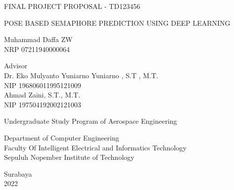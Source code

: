 \begin{large}
  FINAL PROJECT PROPOSAL - TD123456
\end{large}

\vspace{\fill}

\begin{spacing}{1.5}
  \begin{Large}
    POSE BASED SEMAPHORE PREDICTION USING DEEP LEARNING
  \end{Large}
\end{spacing}

\vspace{\fill}

\begin{large}
  Muhammad Daffa ZW \\
  \textnormal{NRP 07211940000064}
\end{large}

\vspace{\fill}

\begin{large}
  \textnormal{Advisor} \\
  Dr. Eko Mulyanto Yuniarno Yuniarno , S.T , M.T. \\
  \textnormal{NIP 196806011995121009} \\
  Ahmad Zaini, S.T., M.T. \\
  \textnormal{NIP 197504192002121003}
\end{large}

\vspace{\fill}

Undergraduate Study Program of Aerospace Engineering \\

\normalfont

Department of Computer Engineering \\
Faculty Of Intelligent Electrical and Informatics Technology \\
Sepuluh Nopember Institute of Technology

Surabaya \\
2022
